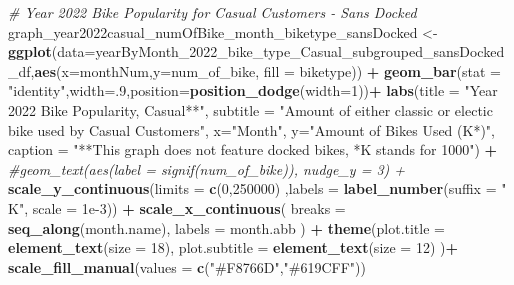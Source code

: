\documentclass[
]{article}
\newenvironment{Shaded}{\begin{snugshade}}{\end{snugshade}}
\newcommand{\AttributeTok}[1]{\textcolor[rgb]{0.13,0.29,0.53}{#1}}
\newcommand{\CommentTok}[1]{\textcolor[rgb]{0.56,0.35,0.01}{\textit{#1}}}
\newcommand{\DecValTok}[1]{\textcolor[rgb]{0.00,0.00,0.81}{#1}}
\newcommand{\FloatTok}[1]{\textcolor[rgb]{0.00,0.00,0.81}{#1}}
\newcommand{\FunctionTok}[1]{\textcolor[rgb]{0.13,0.29,0.53}{\textbf{#1}}}
\newcommand{\NormalTok}[1]{#1}
\newcommand{\OtherTok}[1]{\textcolor[rgb]{0.56,0.35,0.01}{#1}}
\newcommand{\SpecialCharTok}[1]{\textcolor[rgb]{0.81,0.36,0.00}{\textbf{#1}}}
\newcommand{\StringTok}[1]{\textcolor[rgb]{0.31,0.60,0.02}{#1}}
\begin{document}
\begin{Shaded}
\begin{Highlighting}[]
\CommentTok{\# Year 2022 Bike Popularity for Casual Customers {-} Sans Docked}
\NormalTok{graph\_year2022casual\_numOfBike\_month\_biketype\_sansDocked }\OtherTok{\textless{}{-}} \FunctionTok{ggplot}\NormalTok{(}\AttributeTok{data=}\NormalTok{yearByMonth\_2022\_bike\_type\_Casual\_subgrouped\_sansDocked\_df,}\FunctionTok{aes}\NormalTok{(}\AttributeTok{x=}\NormalTok{monthNum,}\AttributeTok{y=}\NormalTok{num\_of\_bike, }\AttributeTok{fill =}\NormalTok{ biketype)) }\SpecialCharTok{+}
  \FunctionTok{geom\_bar}\NormalTok{(}\AttributeTok{stat =} \StringTok{"identity"}\NormalTok{,}\AttributeTok{width=}\NormalTok{.}\DecValTok{9}\NormalTok{,}\AttributeTok{position=}\FunctionTok{position\_dodge}\NormalTok{(}\AttributeTok{width=}\DecValTok{1}\NormalTok{))}\SpecialCharTok{+}
  \FunctionTok{labs}\NormalTok{(}\AttributeTok{title =} \StringTok{"Year 2022 Bike Popularity, Casual**"}\NormalTok{,}
       \AttributeTok{subtitle =} \StringTok{"Amount of either classic or electic bike used by Casual Customers"}\NormalTok{,}
       \AttributeTok{x=}\StringTok{"Month"}\NormalTok{,}
       \AttributeTok{y=}\StringTok{"Amount of Bikes Used (K*)"}\NormalTok{,}
       \AttributeTok{caption =} \StringTok{"**This graph does not feature docked bikes, *K stands for 1000"}\NormalTok{) }\SpecialCharTok{+}
  \CommentTok{\#geom\_text(aes(label = signif(num\_of\_bike)), nudge\_y = 3) +}
  \FunctionTok{scale\_y\_continuous}\NormalTok{(}\AttributeTok{limits =} \FunctionTok{c}\NormalTok{(}\DecValTok{0}\NormalTok{,}\DecValTok{250000}\NormalTok{) ,}\AttributeTok{labels =} \FunctionTok{label\_number}\NormalTok{(}\AttributeTok{suffix =} \StringTok{" K"}\NormalTok{, }\AttributeTok{scale =} \FloatTok{1e{-}3}\NormalTok{)) }\SpecialCharTok{+}
  \FunctionTok{scale\_x\_continuous}\NormalTok{(}
    \AttributeTok{breaks =} \FunctionTok{seq\_along}\NormalTok{(month.name), }
    \AttributeTok{labels =}\NormalTok{ month.abb}
\NormalTok{  )  }\SpecialCharTok{+}
  \FunctionTok{theme}\NormalTok{(}\AttributeTok{plot.title =} \FunctionTok{element\_text}\NormalTok{(}\AttributeTok{size =} \DecValTok{18}\NormalTok{),}
        \AttributeTok{plot.subtitle =} \FunctionTok{element\_text}\NormalTok{(}\AttributeTok{size =} \DecValTok{12}\NormalTok{)}
\NormalTok{  )}\SpecialCharTok{+}
  \FunctionTok{scale\_fill\_manual}\NormalTok{(}\AttributeTok{values =} \FunctionTok{c}\NormalTok{(}\StringTok{"\#F8766D"}\NormalTok{,}\StringTok{"\#619CFF"}\NormalTok{))}


\end{Highlighting}
\end{Shaded}
\end{document}
